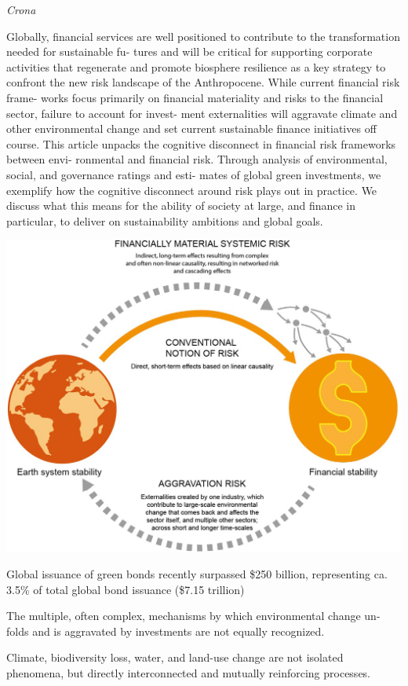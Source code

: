 \documentclass[
]{book}
\begin{document}
\emph{Crona}

Globally, financial services are well positioned to contribute to the transformation needed for sustainable fu-
tures and will be critical for supporting corporate activities that regenerate and promote biosphere resilience
as a key strategy to confront the new risk landscape of the Anthropocene. While current financial risk frame-
works focus primarily on financial materiality and risks to the financial sector, failure to account for invest-
ment externalities will aggravate climate and other environmental change and set current sustainable finance
initiatives off course. This article unpacks the cognitive disconnect in financial risk frameworks between envi-
ronmental and financial risk. Through analysis of environmental, social, and governance ratings and esti-
mates of global green investments, we exemplify how the cognitive disconnect around risk plays out in
practice. We discuss what this means for the ability of society at large, and finance in particular, to deliver
on sustainability ambitions and global goals.

\includegraphics{fig/externalities_risks.png}

Global issuance of green bonds recently
surpassed \$250 billion, representing ca. 3.5\% of total global
bond issuance (\$7.15 trillion)

The multiple, often complex, mechanisms by which environmental change un-
folds and is aggravated by investments are not equally recognized.

Climate, biodiversity loss, water, and land-use change
are not isolated phenomena, but directly interconnected and
mutually reinforcing processes.
\end{document}
